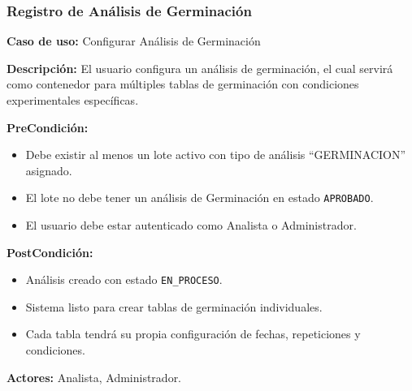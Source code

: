 \subsubsection{Registro de Análisis de Germinación}

\noindent\textbf{Caso de uso:} Configurar Análisis de Germinación

\vspace{0.5em}
\noindent\textbf{Descripción:} El usuario configura un análisis de germinación, el cual servirá como contenedor para múltiples tablas de germinación con condiciones experimentales específicas.

\vspace{0.5em}
\noindent\textbf{PreCondición:}
\begin{itemize}[nosep]
    \item Debe existir al menos un lote activo con tipo de análisis ``GERMINACION'' asignado.
    \item El lote no debe tener un análisis de Germinación en estado \texttt{APROBADO}.
    \item El usuario debe estar autenticado como Analista o Administrador.
\end{itemize}

\vspace{0.5em}
\noindent\textbf{PostCondición:}
\begin{itemize}[nosep]
    \item Análisis creado con estado \texttt{EN\_PROCESO}.
    \item Sistema listo para crear tablas de germinación individuales.
    \item Cada tabla tendrá su propia configuración de fechas, repeticiones y condiciones.
\end{itemize}

\vspace{0.5em}
\noindent\textbf{Actores:} Analista, Administrador.

